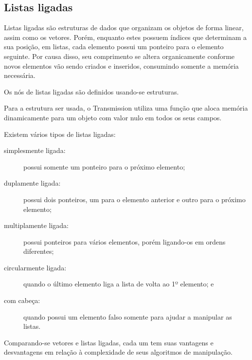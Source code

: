 
\newpage
\subsection*{Listas ligadas}

Listas ligadas são estruturas de dados que organizam os objetos de forma linear, assim
como os vetores. Porém, enquanto estes possuem índices que determinam a sua posição, em
listas, cada elemento possui um ponteiro para o elemento seguinte. Por causa disso,
seu comprimento se altera organicamente conforme novos elementos vão sendo criados e
inseridos, consumindo somente a memória necessária.

Os nós de listas ligadas são definidos usando-se estruturas.


Para a estrutura ser usada, o Transmission utiliza uma função que aloca memória
dinamicamente para um objeto com valor nulo em todos os seus campos.


Existem vários tipos de listas ligadas:

\begin{description}
    \item[simplesmente ligada:] possui somente um ponteiro para o próximo elemento;
    \item[duplamente ligada:] possui dois ponteiros, um para o elemento anterior e outro
        para o próximo elemento;
    \item[multiplamente ligada:] possui ponteiros para vários elementos, porém
        ligando-os em ordens diferentes;
    \item[circularmente ligada:] quando o último elemento liga a lista de volta ao
        1º elemento; e
    \item[com cabeça:] quando possui um elemento falso somente para ajudar a manipular
        as listas.
\end{description}

Comparando-se vetores e listas ligadas, cada um tem suas vantagens e desvantagens em
relação à complexidade de seus algoritmos de manipulação.

